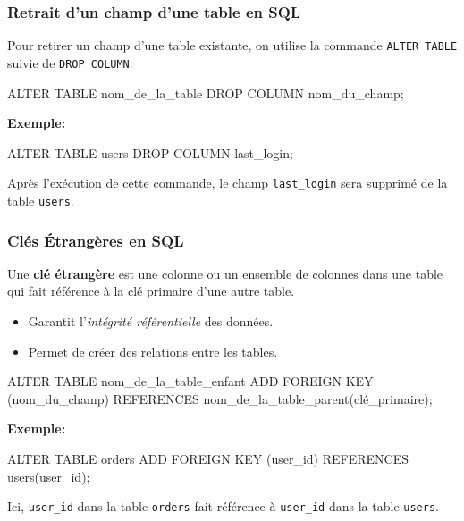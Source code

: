 \begin{frame}[fragile]
  \frametitle{Retrait d'un champ d'une table en SQL}

  Pour retirer un champ d'une table existante, on utilise la commande \texttt{ALTER TABLE} suivie de \texttt{DROP COLUMN}.

  \begin{semiverbatim}
ALTER TABLE nom\_de\_la\_table
DROP COLUMN nom\_du\_champ;
  \end{semiverbatim}

  \textbf{Exemple:}
  \begin{semiverbatim}
ALTER TABLE users
DROP COLUMN last\_login;
  \end{semiverbatim}

  Après l'exécution de cette commande, le champ \texttt{last\_login} sera supprimé de la table \texttt{users}.

\end{frame}

\begin{frame}[fragile]
  \frametitle{Clés Étrangères en SQL}

  Une \textbf{clé étrangère} est une colonne ou un ensemble de colonnes dans une table qui fait référence à la clé primaire d'une autre table.

  \begin{itemize}
    \item Garantit l'\textit{intégrité référentielle} des données.
    \item Permet de créer des relations entre les tables.
  \end{itemize}

  \begin{semiverbatim}
ALTER TABLE nom\_de\_la\_table\_enfant
ADD FOREIGN KEY (nom\_du\_champ)
REFERENCES nom\_de\_la\_table\_parent(clé\_primaire);
  \end{semiverbatim}

  \textbf{Exemple:}
  \begin{semiverbatim}
ALTER TABLE orders
ADD FOREIGN KEY (user\_id)
REFERENCES users(user\_id);
  \end{semiverbatim}

  Ici, \texttt{user\_id} dans la table \texttt{orders} fait référence à \texttt{user\_id} dans la table \texttt{users}.

\end{frame}

